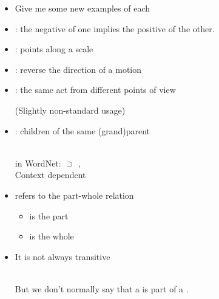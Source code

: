 \documentclass[headrule,footrule]{foils}
\begin{document}
\begin{itemize}
\item Give me some new examples of each\task
\item {}: the negative of one implies the positive of the other.
  \begin{exe}
    \ex {}
    \ex {}
  \end{exe}
\item {}: points  along a scale
  \begin{exe}
    \ex {}
    \ex {}
  \end{exe}
\item {}: reverse the direction of a motion
  \begin{exe}
    \ex {}
    \ex {}
  \end{exe}
\item {}: the same act from different points of view
  \begin{exe}
    \ex {}
    \ex {}
  \end{exe}
  (Slightly non-standard usage)
\item {}: children of the same (grand)parent
  \begin{exe}
    \ex {}
    \\ \textnormal{in WordNet:}  $\supset$ , 
    \ex {}
    \\  \textnormal{Context dependent}
  \end{exe}
\end{itemize}


\begin{itemize}
\item {} refers to the part-whole relation
  \begin{itemize}
  \item {} is the part
  \item {} is the whole
  \end{itemize}
  \begin{tree}
  \end{tree}
\item It is not always transitive
  \begin{tree}
   \end{tree} \\
  But we don't normally say that a  is part of a .
\end{itemize}
\end{document}
